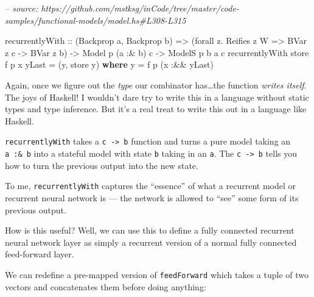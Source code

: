 \documentclass[]{article}
\newenvironment{Shaded}{}{}
\newcommand{\CommentTok}[1]{\textcolor[rgb]{0.38,0.63,0.69}{\textit{#1}}}
\newcommand{\DataTypeTok}[1]{\textcolor[rgb]{0.56,0.13,0.00}{#1}}
\newcommand{\FunctionTok}[1]{\textcolor[rgb]{0.02,0.16,0.49}{#1}}
\newcommand{\KeywordTok}[1]{\textcolor[rgb]{0.00,0.44,0.13}{\textbf{#1}}}
\newcommand{\NormalTok}[1]{#1}
\newcommand{\OtherTok}[1]{\textcolor[rgb]{0.00,0.44,0.13}{#1}}
\begin{document}
\begin{Shaded}
\begin{Highlighting}[]
\CommentTok{-- source: https://github.com/mstksg/inCode/tree/master/code-samples/functional-models/model.hs#L308-L315}

\NormalTok{recurrentlyWith}
\OtherTok{    ::}\NormalTok{ (}\DataTypeTok{Backprop}\NormalTok{ a, }\DataTypeTok{Backprop}\NormalTok{ b)}
    \OtherTok{=>}\NormalTok{ (forall z}\FunctionTok{.} \DataTypeTok{Reifies}\NormalTok{ z }\DataTypeTok{W} \OtherTok{=>} \DataTypeTok{BVar}\NormalTok{ z c }\OtherTok{->} \DataTypeTok{BVar}\NormalTok{ z b)}
    \OtherTok{->} \DataTypeTok{Model}\NormalTok{  p   (a }\FunctionTok{:&}\NormalTok{ b) c}
    \OtherTok{->} \DataTypeTok{ModelS}\NormalTok{ p b  a       c}
\NormalTok{recurrentlyWith store f p x yLast }\FunctionTok{=}\NormalTok{ (y, store y)}
  \KeywordTok{where}
\NormalTok{    y }\FunctionTok{=}\NormalTok{ f p (x }\FunctionTok{:&&}\NormalTok{ yLast)}
\end{Highlighting}
\end{Shaded}

Again, once we figure out the \emph{type} our combinator has\ldots{}the function
\emph{writes itself}. The joys of Haskell! I wouldn't dare try to write this in
a language without static types and type inference. But it's a real treat to
write this out in a language like Haskell.

\texttt{recurrentlyWith} takes a \texttt{c\ -\textgreater{}\ b} function and
turns a pure model taking an \texttt{a\ :\&\ b} into a stateful model with state
\texttt{b} taking in an \texttt{a}. The \texttt{c\ -\textgreater{}\ b} tells you
how to turn the previous output into the new state.

To me, \texttt{recurrentlyWith} captures the ``essence'' of what a recurrent
model or recurrent neural network is --- the network is allowed to ``see'' some
form of its previous output.

How is this useful? Well, we can use this to define a fully connected recurrent
neural network layer as simply a recurrent version of a normal fully connected
feed-forward layer.

We can redefine a pre-mapped version of \texttt{feedForward} which takes a tuple
of two vectors and concatenates them before doing anything:
\end{document}
